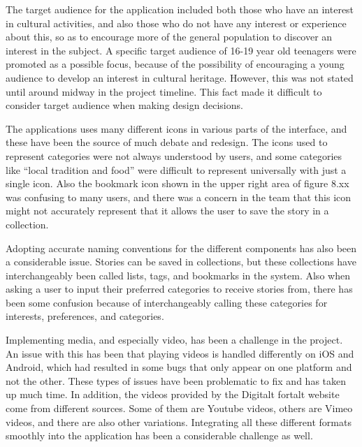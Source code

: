The target audience for the application included both those who have an interest in cultural activities, and also those who do not have any interest or experience about this, so as to encourage more of the general population to discover an interest in the subject. A specific target audience of 16-19 year old teenagers were promoted as a possible focus, because of the possibility of encouraging a young audience to develop an interest in cultural heritage. However, this was not stated until around  midway in the project timeline. This fact made it difficult to consider target audience when making design decisions. \newline

The applications uses many different icons in various parts of the interface, and these have been the source of much debate and redesign. The icons used to represent categories were not always understood by users, and some categories like “local tradition and food” were difficult to represent universally with just a single icon. Also the bookmark icon shown in the upper right area of figure 8.xx was confusing to many users, and there was a concern in the team that this icon might not accurately represent that it allows the user to save the story in a collection.\newline

Adopting accurate naming conventions for the different components has also been a considerable issue. Stories can be saved in collections, but these collections have interchangeably been called lists, tags, and bookmarks in the system. Also when asking a user to input their preferred categories to receive stories from, there has been some confusion because of interchangeably calling these categories for interests,  preferences, and categories.\newline

Implementing media, and especially video, has been a challenge in the project. An issue with this has been that playing videos is handled differently on iOS and Android, which had resulted in some bugs that only appear on one platform and not the other. These types of issues have been problematic to fix and has taken up much time. In addition, the videos provided by the Digitalt fortalt website come from different sources. Some of them are Youtube videos, others are Vimeo videos, and there are also other variations. Integrating all these different formats smoothly into the application has been a considerable challenge as well. \newline

